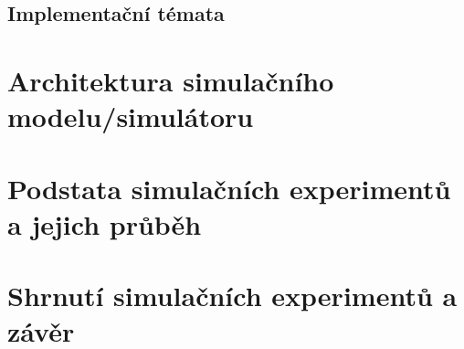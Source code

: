 \documentclass[12pt,a4paper]{report}
\begin{document}
\section{Implementační témata}
\chapter{Architektura simulačního modelu/simulátoru}
\chapter{Podstata simulačních experimentů a jejich průběh}
\chapter{Shrnutí simulačních experimentů a závěr}
\end{document}
